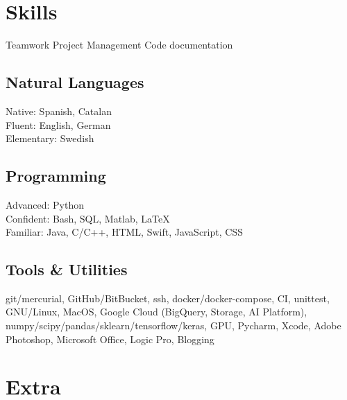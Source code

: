 \documentclass[]{deedy-resume}
\begin{document}
\begin{minipage}[t]{0.43\textwidth}


\section{Skills}
Teamwork \textbullet{} Project Management \textbullet{} Code documentation\\

\subsection{Natural Languages}
Native: Spanish, Catalan \\
Fluent: English, German \\
Elementary: Swedish\\


\subsection{Programming}
{Advanced:} Python \\
{Confident:} Bash, SQL, Matlab, \LaTeX\\
{Familiar:} Java, C/C++, HTML, Swift, JavaScript, CSS\\

\sectionsep

\subsection{Tools \& Utilities}
git/mercurial, GitHub/BitBucket, ssh, docker/docker-compose, CI, unittest, GNU/Linux, MacOS, Google Cloud (BigQuery,
Storage, AI Platform), numpy/scipy/pandas/sklearn/tensorflow/keras, GPU, Pycharm, Xcode, Adobe Photoshop,
Microsoft Office, Logic Pro, Blogging\\

\sectionsep


\section{Extra}


\end{minipage}
\end{document}
